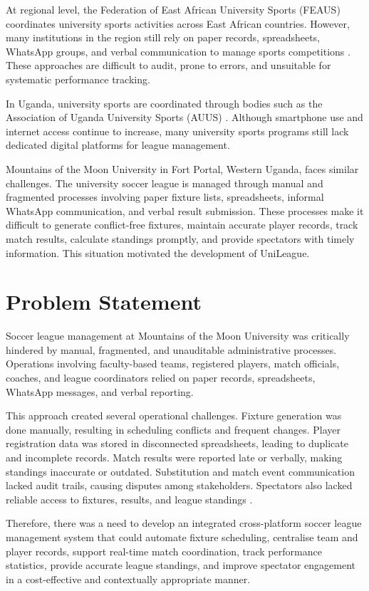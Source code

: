 \documentclass[12pt,a4paper]{report}
\begin{document}
At regional level, the Federation of East African University Sports (FEAUS) coordinates
university sports activities across East African countries. However, many institutions in the
region still rely on paper records, spreadsheets, WhatsApp groups, and verbal communication to
manage sports competitions \cite{feaus2024,feaus_objectives}. These approaches are difficult to audit, prone to
errors, and unsuitable for systematic performance tracking.

In Uganda, university sports are coordinated through bodies such as the Association of Uganda
University Sports (AUUS) \cite{ncs_act2023,auus2020}. Although smartphone use and internet access continue
to increase, many university sports programs still lack dedicated digital platforms for league
management.

Mountains of the Moon University in Fort Portal, Western Uganda, faces similar challenges.
The university soccer league is managed through manual and fragmented processes involving paper
fixture lists, spreadsheets, informal WhatsApp communication, and verbal result submission.
These processes make it difficult to generate conflict-free fixtures, maintain accurate player
records, track match results, calculate standings promptly, and provide spectators with timely
information. This situation motivated the development of UniLeague.

\section{Problem Statement}
Soccer league management at Mountains of the Moon University was critically hindered by manual,
fragmented, and unauditable administrative processes. Operations involving faculty-based teams,
registered players, match officials, coaches, and league coordinators relied on paper records,
spreadsheets, WhatsApp messages, and verbal reporting.

This approach created several operational challenges. Fixture generation was done manually,
resulting in scheduling conflicts and frequent changes. Player registration data was stored in
disconnected spreadsheets, leading to duplicate and incomplete records. Match results were
reported late or verbally, making standings inaccurate or outdated. Substitution and match event
communication lacked audit trails, causing disputes among stakeholders. Spectators also lacked
reliable access to fixtures, results, and league standings \cite{sarlak2024}.

Therefore, there was a need to develop an integrated cross-platform soccer league management
system that could automate fixture scheduling, centralise team and player records, support
real-time match coordination, track performance statistics, provide accurate league standings,
and improve spectator engagement in a cost-effective and contextually appropriate manner.
\end{document}
